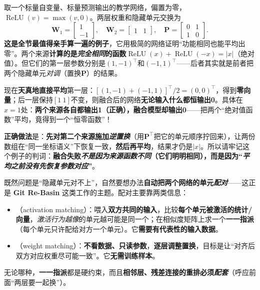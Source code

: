 \begin{example}[完全相同的函数也不能直接平均]
  \label{ex:ket-integration-permutation}
  取一个标量自变量、标量预测输出的教学网络，偏置为零，$\operatorname{ReLU}(v)=\max(v,0)$。两层权重和隐藏单元交换为
  \[
    \bm{W}_1=\begin{bmatrix}1\\-1\end{bmatrix},\quad
    \bm{W}_2=\begin{bmatrix}1&1\end{bmatrix},\quad
    \bm{P}=\begin{bmatrix}0&1\\1&0\end{bmatrix}.
  \]
  \textbf{这是全节最值得亲手算一遍的例子}，它用极简的网络证明“功能相同也能平均出零”。两个来源\textbf{计算的是\emph{完全相同}的函数}$\operatorname{ReLU}(x)+\operatorname{ReLU}(-x)=|x|$（绝对值）。但它们的第一层参数分别是$(1,-1)^\top$和$(-1,1)^\top$——后者其实就是前者把两个隐藏单元\emph{对调}（置换$\bm{P}$）的结果。

现在\textbf{天真地直接平均}第一层：$[(1,-1)+(-1,1)]^\top/2=(0,0)^\top$，得到\textbf{零向量}；后一层保持$[1\ 1]$不变，则融合后的网络\textbf{无论输入什么都恒输出0}。具体在$x=1$处：\textbf{两个来源各自都输出1（正确），融合模型却输出0}——把两个“绝对值函数”平均，竟得到一个“恒零函数”！

\textbf{正确做法}是：\textbf{先对第二个来源施加\emph{逆置换}}（用$\bm{P}^{\top}$把它的单元顺序拧回来），让两份数组在“同一坐标语义”下恢复一致，\textbf{然后再平均}，结果才仍是$|x|$。所以请牢记这个例子的判词：\textbf{融合失败\emph{不是因为来源函数不同}（它们明明相同），而是因为“\emph{平均之前没有先恢复参数对应}”}。
\end{example}

既然问题是“隐藏单元对不上”，自然要想办法\textbf{自动把两个网络的单元\emph{配对}}——这正是 \textbf{Git Re-Basin} 这类工作的主题。配对主要靠两类信息：
\begin{itemize}\item {}（activation matching）：喂入\textbf{双方共同的输入}，比较\textbf{每个单元被激活的统计/向量}，\emph{激活行为越像}的单元越可能是同一个；在相似度矩阵上求一个\textbf{一一指派}（每个单元只许配给对方一个单元）。它\textbf{需要有代表性的输入数据}。\item {}（weight matching）：\textbf{不看数据、只读参数}，\textbf{逐层调整置换}，目标是让“对齐后双方对应权重尽可能一致”。它\textbf{无需训练样本}。\end{itemize}
无论哪种，\textbf{一一指派}都是硬约束，而且\textbf{相邻层、残差连接的重排必须\emph{配套}}（呼应前面“两层要一起换”）。

